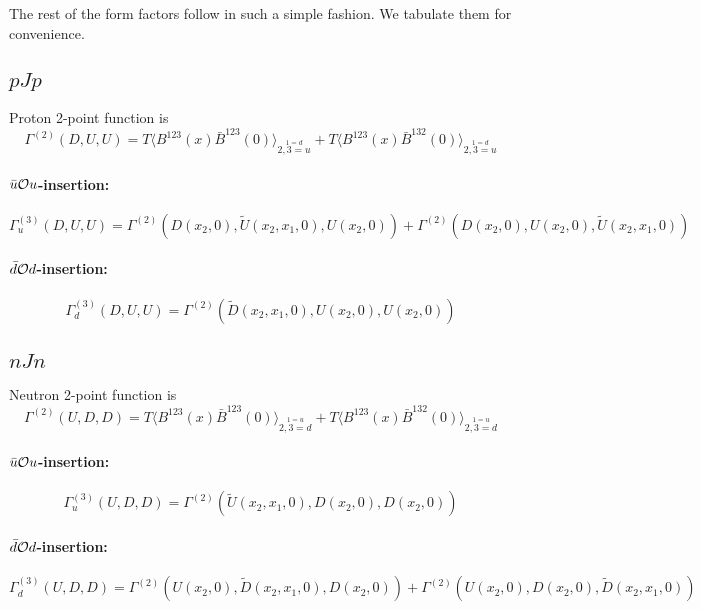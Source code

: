 \documentclass[12pt]{article}
\begin{document}
The rest of the form factors follow in such a simple fashion. We tabulate them
for convenience.

\subsection{$p J p$}
Proton 2-point function is
\[
\Gamma^{(2)}(D,U,U) 
  = T \langle B^{123}(x) \bar{B}^{123}(0)\rangle_{\stackrel{1=d}{2,3=u}}
  + T \langle B^{123}(x) \bar{B}^{132}(0)\rangle_{\stackrel{1=d}{2,3=u}}
\]

\paragraph{$\bar{u}{\cal O}u$-insertion:}
\[
\Gamma^{(3)}_u(D,U,U) = \Gamma^{(2)}(D(x_2,0),\widetilde{U}(x_2,x_1,0),U(x_2,0))
 +  \Gamma^{(2)}(D(x_2,0),U(x_2,0),\widetilde{U}(x_2,x_1,0))
\]

\paragraph{$\bar{d}{\cal O}d$-insertion:}
\[
\Gamma^{(3)}_d(D,U,U) = \Gamma^{(2)}(\widetilde{D}(x_2,x_1,0),U(x_2,0),U(x_2,0))
\]

\subsection{$n J n$}
Neutron 2-point function is
\[
\Gamma^{(2)}(U,D,D) 
  = T \langle B^{123}(x) \bar{B}^{123}(0)\rangle_{\stackrel{1=u}{2,3=d}}
  + T \langle B^{123}(x) \bar{B}^{132}(0)\rangle_{\stackrel{1=u}{2,3=d}}
\]

\paragraph{$\bar{u}{\cal O}u$-insertion:}
\[
\Gamma^{(3)}_u(U,D,D) = \Gamma^{(2)}(\widetilde{U}(x_2,x_1,0),D(x_2,0),D(x_2,0))
\]

\paragraph{$\bar{d}{\cal O}d$-insertion:}
\[
\Gamma^{(3)}_d(U,D,D) = \Gamma^{(2)}(U(x_2,0),\widetilde{D}(x_2,x_1,0),D(x_2,0))
 +  \Gamma^{(2)}(U(x_2,0),D(x_2,0),\widetilde{D}(x_2,x_1,0))
\]
\end{document}
